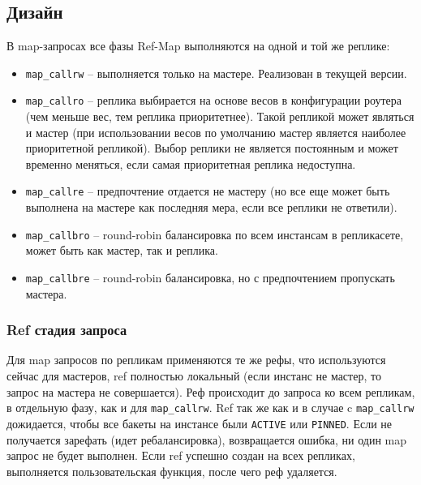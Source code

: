 \subsection{Дизайн}

В map-запросах все фазы Ref-Map выполняются на одной и той же реплике:

\begin{itemize}
\item \texttt{map\_callrw} -- выполняется только на мастере. Реализован в
    текущей версии.

\item \texttt{map\_callro} -- реплика выбирается на основе весов в конфигурации
    роутера (чем меньше вес, тем реплика приоритетнее). Такой репликой может
        являться и мастер (при использовании весов по умолчанию мастер является
        наиболее приоритетной репликой). Выбор реплики не является постоянным и
        может временно меняться, если самая приоритетная реплика недоступна.

\item \texttt{map\_callre} -- предпочтение отдается не мастеру (но все еще
    может быть выполнена на мастере как последняя мера, если все реплики не
        ответили).

\item \texttt{map\_callbro} -- round-robin балансировка по всем инстансам в
    репликасете, может быть как мастер, так и реплика.

\item \texttt{map\_callbre} -- round-robin балансировка, но с предпочтением
    пропускать мастера.
\end{itemize}

\subsubsection{Ref стадия запроса}

Для map запросов по репликам применяются те же рефы, что используются сейчас
для мастеров, ref полностью локальный (если инстанс не мастер, то запрос на
мастера не совершается). Реф происходит до запроса ко всем репликам, в
отдельную фазу, как и для \texttt{map\_callrw}. Ref так же как и в случае c
\texttt{map\_callrw} дожидается, чтобы все бакеты на инстансе были
\texttt{ACTIVE} или \texttt{PINNED}. Если не получается зарефать (идет
ребалансировка), возвращается ошибка, ни один map запрос не будет выполнен.
Если ref успешно создан на всех репликах, выполняется пользовательская функция,
после чего реф удаляется.

